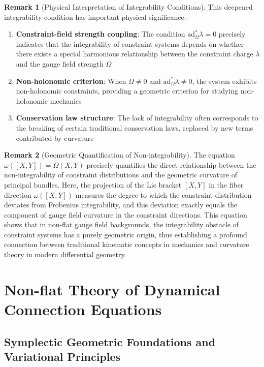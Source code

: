 \documentclass[a4paper,12pt]{extarticle}
\theoremstyle{definition}
\newtheorem{remark}{Remark}
\begin{document}
\begin{remark}[Physical Interpretation of Integrability Conditions]
This deepened integrability condition has important physical significance:
\begin{enumerate}
\item \textbf{Constraint-field strength coupling}: The condition $\text{ad}_\Omega^* \lambda = 0$ precisely indicates that the integrability of constraint systems depends on whether there exists a special harmonious relationship between the constraint charge $\lambda$ and the gauge field strength $\Omega$
\item \textbf{Non-holonomic criterion}: When $\Omega \neq 0$ and $\text{ad}_\Omega^* \lambda \neq 0$, the system exhibits non-holonomic constraints, providing a geometric criterion for studying non-holonomic mechanics
\item \textbf{Conservation law structure}: The lack of integrability often corresponds to the breaking of certain traditional conservation laws, replaced by new terms contributed by curvature
\end{enumerate}
\end{remark}

\begin{remark}[Geometric Quantification of Non-integrability]
The equation $\omega([X, Y]) = \Omega(X, Y)$ precisely quantifies the direct relationship between the non-integrability of constraint distributions and the geometric curvature of principal bundles. Here, the projection of the Lie bracket $[X, Y]$ in the fiber direction $\omega([X, Y])$ measures the degree to which the constraint distribution deviates from Frobenius integrability, and this deviation exactly equals the component of gauge field curvature in the constraint directions. This equation shows that in non-flat gauge field backgrounds, the integrability obstacle of constraint systems has a purely geometric origin, thus establishing a profound connection between traditional kinematic concepts in mechanics and curvature theory in modern differential geometry.
\end{remark}

\section{Non-flat Theory of Dynamical Connection Equations}

\subsection{Symplectic Geometric Foundations and Variational Principles}
\end{document}
